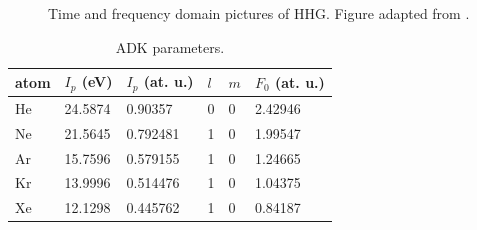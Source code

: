 \begin{figure}
	\centering
	\qquad
	\caption{Time and frequency domain pictures of HHG. Figure adapted from \cite{eichTimeAngleresolvedPhotoemission2014}.}
	\label{fig:APT_IR_field}
\end{figure}

\begin{table}[]
	\centering
	\begin{tabular}{l|l|l|l|l|l}
		atom & $I_p$ (eV) & $I_p$ (at. u.) & $l$ & $m$ & $F_0$ (at. u.) \\ \hline
		He & 24.5874 & 0.90357 & 0 & 0 & 2.42946 \\
		Ne & 21.5645 & 0.792481 & 1 & 0 & 1.99547 \\
		Ar & 15.7596 & 0.579155 & 1 & 0 & 1.24665 \\
		Kr & 13.9996 & 0.514476 & 1 & 0 & 1.04375 \\
		Xe & 12.1298 & 0.445762 & 1 & 0 & 0.84187
	\end{tabular}
	\caption{ADK parameters.}
	\label{tab:ADK-params}
\end{table}

